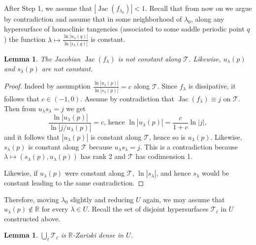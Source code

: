 \documentclass[11pt, oneside]{amsart}
\newcommand{\R}{\mathbb{R}}
\newcommand{\abs}[1]{\left\vert#1\right\vert}
\newcommand{\la}{\lambda}
\newcommand{\lo}{{\lambda_0}}
\DeclareMathOperator{\jac}{Jac}
\newtheorem{lem}[prop] {Lemma}
\theoremstyle{remark}
\theoremstyle{definition}
\theoremstyle{theorem}
\begin{document}
After Step 1, we   assume  that  $\abs{\jac(f_\lo)} < 1$. Recall that from now on we argue by contradiction and assume that 
in some neighborhood of $\lo$, 
 along any hypersurface of homoclinic tangencies (associated to some saddle periodic point $q$) the 
 function $\lambda \mapsto \frac{\ln\abs{u_\la(q )}}{\ln\abs{s_\la(q )}}$ is constant. 
 
 \begin{lem} \label{lem:jacobian}
The Jacobian $\jac (f_\la)$ is not constant along $\mathcal T$. Likewise, 
$u_\lambda(p)$  and $s_\lambda(p)$ are not constant. 
\end{lem}

\begin{proof}
Indeed by assumption $\frac{\ln\abs{u_\la(p)}}{\ln\abs{s_\la(p)}} = c$ along $\mathcal T$. Since $f_\la$ is dissipative, it follows  that  $c\in (-1, 0)$. Assume by contradiction that $\jac (f_\la) \equiv j $ on 
  $\mathcal T$. Then from $u_\la s_\la = j$ we get 
$$\frac{\ln\abs{u_\la(p)}}{\ln\abs{j/u_\la(p)}} = c\text{, hence    } \ln\abs{u_\la(p)} = \frac{c}{1+c} \ln \abs{j},$$ and it follows that 
$ \abs{u_\la(p)}$ is constant along $\mathcal T$, hence so is  $u_\la(p)$. Likewise,  
  $s_\la(p)$ is constant along $\mathcal T$ because 
$u_\la s_\la = j$.  This is a contradiction
because $\lambda \mapsto (s_\la(p), u_\la(p))$ has rank 2 and $\mathcal T$ has codimension 1. 
 
Likewise, if  $u_\la(p)$ were constant along $\mathcal T$, 
 $\ln\abs{s_\la}$, and hence  $s_\la$  would be  constant 
 leading to the same contradiction. 
 \end{proof}
 
 Therefore, moving $\lo$  slightly and reducing $U$ again, 
we may assume that $u_{\la}(p)\notin\R$ for every $\lambda\in U$. 
Recall the set of disjoint hypersurfaces $\mathcal T_\ell$ in $U$ constructed above. 

\begin{lem}\label{lem:R_Zariski}
$\bigcup_\ell \mathcal T_\ell$ is $\R$-Zariski dense in $U$. 
\end{lem}
 
\end{document}
